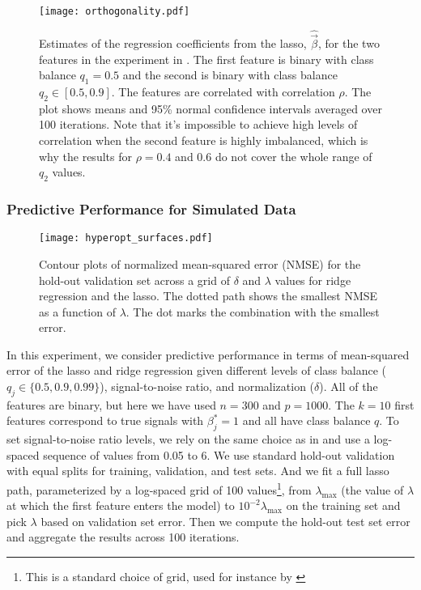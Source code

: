 \begin{figure}[htpb]
  \centering
  \texttt{[image: orthogonality.pdf]}
  \caption{%
    Estimates of the regression coefficients from the lasso,
    \(\hat{\vec{\beta}}\), for the two features in the experiment in
    . The first feature is binary with class
    balance \(q_1 = 0.5\) and the second is binary with class balance \(q_2 \in [0.5, 0.9]\).
    The features are correlated with correlation \(\rho\). The plot shows means and
    95\% normal confidence intervals averaged over 100 iterations. Note
    that it's impossible to achieve high levels of correlation when the second
    feature is highly imbalanced, which is why the results for \(\rho = 0.4\) and \(0.6\)
    do not cover the whole range of \(q_2\) values.
  }
  \label{fig:orthogonality}
\end{figure}

\subsubsection{Predictive Performance for Simulated Data}%
\label{sec:predictive-performance-simulated}

\begin{figure}[htpb]
  \centering
  \texttt{[image: hyperopt\_surfaces.pdf]}
  \caption{%
    Contour plots of normalized mean-squared error (NMSE) for the hold-out validation set
    across a grid of \(\delta\) and \(\lambda\) values for ridge regression and the lasso. The
    dotted path shows the smallest NMSE as a function of \(\lambda\). The dot marks the
    combination with the smallest error.
  }
  \label{fig:hyperopt-contours-full}
\end{figure}

In this experiment, we consider predictive performance in terms of mean-squared error of
the lasso and ridge regression given different levels of class balance (\(q_j \in \{0.5,
0.9, 0.99\}\)), signal-to-noise ratio, and normalization (\(\delta\)). All of the features
are binary, but here we have used \(n=300\) and \(p = \num{1000}\). The \(k=10\) first
features correspond to true signals with \(\beta^*_j = 1\) and all have class balance
\(q\). To set signal-to-noise ratio levels, we rely on the same choice as in
\citet{hastie2020} and use a log-spaced sequence of values from 0.05 to 6. We use standard
hold-out validation with equal splits for training, validation, and test sets. And we fit a
full lasso path, parameterized by a log-spaced grid of 100 values\footnote{This is a
  standard choice of grid, used for instance by \citet{friedman2010}}, from
\(\lambda_\text{max}\) (the value of \(\lambda\) at which the first feature enters the
model) to \(10^{-2}\lambda_\text{max}\) on the training set and pick \(\lambda\) based on
validation set error. Then we compute the hold-out test set error and aggregate the results
across 100 iterations.

